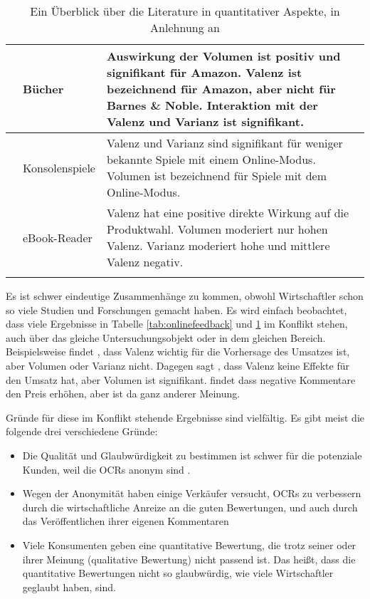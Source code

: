 \begin{longtable}{p{} p{}  p{}}
\citet{monic2012how}& Bücher& Auswirkung der Volumen ist positiv und signifikant für Amazon. Valenz ist bezeichnend für Amazon, aber nicht für  Barnes \& Noble. Interaktion mit der Valenz und Varianz ist signifikant.\\ \hline
\citet{Zhu2010}& Konsolenspiele& Valenz und Varianz sind signifikant für weniger bekannte Spiele mit einem Online-Modus. Volumen ist bezeichnend für Spiele mit dem Online-Modus.\\ \hline
\citet{Kostyra2015}& eBook-Reader& Valenz hat eine positive direkte Wirkung auf die Produktwahl. Volumen moderiert nur hohen Valenz. Varianz moderiert hohe und mittlere Valenz negativ.\\ \hline
\caption[Ein Überblick über die Literature in quantitativer Aspekte]{Ein Überblick über die Literature in quantitativer Aspekte, in Anlehnung an \citet{Kostyra2015}}
\label{tab:quantitativOCR}
\end{longtable}

Es ist schwer eindeutige Zusammenhänge zu kommen, obwohl Wirtschaftler schon so viele Studien und Forschungen gemacht haben. Es wird einfach beobachtet, dass viele Ergebnisse in Tabelle \ref{tab:onlinefeedback} und \ref{tab:quantitativOCR} im Konflikt stehen, auch über das gleiche Untersuchungsobjekt oder in dem gleichen Bereich. Beispielsweise findet \citet{pradeep2010the}, dass Valenz wichtig für die Vorhersage des Umsatzes ist, aber Volumen oder Varianz nicht. Dagegen sagt \citet{Duan20081007}, dass Valenz keine Effekte für den Umsatz hat, aber Volumen ist signifikant.\citet{kauffman2000running} findet dass negative Kommentare den Preis erhöhen, aber \citet{lucking2007pennies} ist da ganz anderer Meinung. 

Gründe für diese im Konflikt stehende Ergebnisse sind vielfältig. Es gibt meist die folgende drei verschiedene Gründe:
\begin{itemize}
	\item Die Qualität und Glaubwürdigkeit zu bestimmen ist schwer für die potenziale Kunden, weil die \ac{OCRs} anonym sind \citep{chatterjee2001online, schindler2005published}.
	\item Wegen der Anonymität haben einige Verkäufer versucht, \ac{OCRs} zu verbessern durch die wirtschaftliche Anreize an die guten Bewertungen, und auch durch das Veröffentlichen ihrer eigenen Kommentaren \citep{chatterjee2001online}
	\item Viele Konsumenten geben eine quantitative Bewertung, die trotz seiner oder ihrer Meinung (qualitative Bewertung) nicht passend ist. Das heißt, dass die quantitative Bewertungen nicht so glaubwürdig, wie viele Wirtschaftler geglaubt haben, sind.
\end{itemize}

